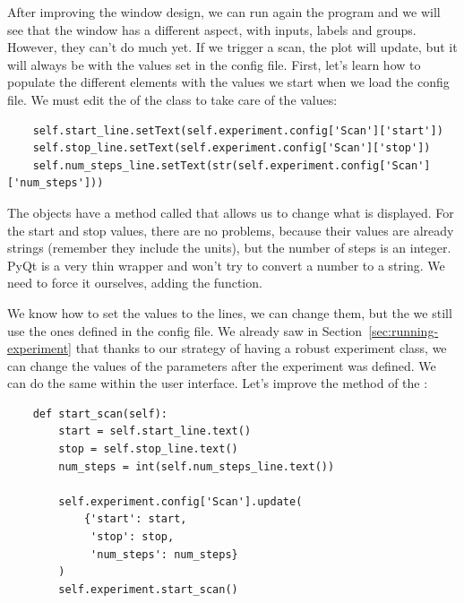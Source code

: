 
After improving the window design, we can run again the program and we will see that the window has a different aspect, with inputs, labels and groups. However, they can't do much yet. If we trigger a scan, the plot will update, but it will always be with the values set in the config file. First, let's learn how to populate the different elements with the values we start when we load the config file. We must edit the  of the  class to take care of the values:

\begin{verbatim}
    self.start_line.setText(self.experiment.config['Scan']['start'])
    self.stop_line.setText(self.experiment.config['Scan']['stop'])
    self.num_steps_line.setText(str(self.experiment.config['Scan']['num_steps']))
\end{verbatim}

The  objects have a method called  that allows us to change what is displayed. For the start and stop values, there are no problems, because their values are already strings (remember they include the units), but the number of steps is an integer. PyQt is a very thin wrapper and won't try to convert a number to a string. We need to force it ourselves, adding the  function.


We know how to set the values to the lines, we can change them, but the we still use the ones defined in the config file. We already saw in Section~\ref{sec:running-experiment} that thanks to our strategy of having a robust experiment class, we can change the values of the parameters after the experiment was defined. We can do the same within the user interface. Let's improve the  method of the :

\begin{verbatim}
    def start_scan(self):
        start = self.start_line.text()
        stop = self.stop_line.text()
        num_steps = int(self.num_steps_line.text())

        self.experiment.config['Scan'].update(
            {'start': start,
             'stop': stop,
             'num_steps': num_steps}
        )
        self.experiment.start_scan()
\end{verbatim}

